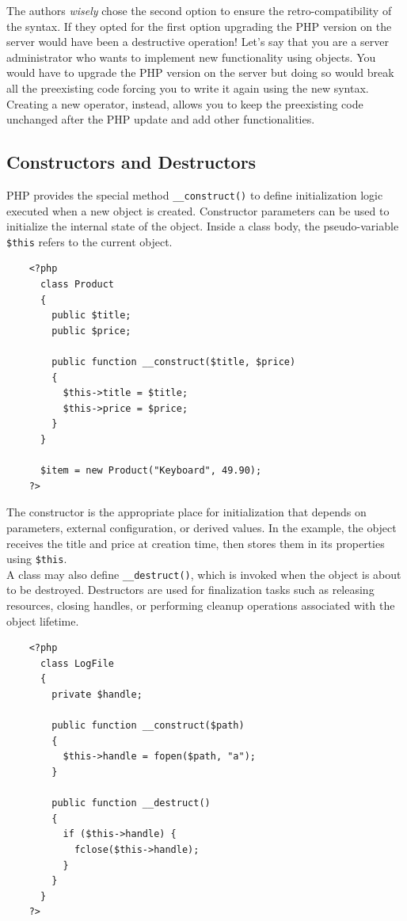 \documentclass{scrbook}
\begin{document}
	The authors \emph{wisely} chose the second option to ensure the retro-compatibility of the syntax. If they opted for the first option upgrading the PHP version on the server would have been a destructive operation! Let's say that you are a server administrator who wants to implement new functionality using objects. You would have to upgrade the PHP version on the server but doing so would break all the preexisting code forcing you to write it again using the new syntax. Creating a new operator, instead, allows you to keep the preexisting code unchanged after the PHP update and add other functionalities.
	
	\subsection{Constructors and Destructors}
	
	PHP provides the special method \texttt{\_\_construct()} to define initialization logic executed when a new object is created. Constructor parameters can be used to initialize the internal state of the object. Inside a class body, the pseudo-variable \texttt{\$this} refers to the current object.
	
	\begin{lstlisting}
	<?php
	  class Product
	  {
		public $title;
		public $price;
	
		public function __construct($title, $price)
		{
		  $this->title = $title;
		  $this->price = $price;
		}
	  }
		
	  $item = new Product("Keyboard", 49.90);
	?>
	\end{lstlisting}
	
	The constructor is the appropriate place for initialization that depends on parameters, external configuration, or derived values. In the example, the object receives the title and price at creation time, then stores them in its properties using \texttt{\$this}.\\
	
	A class may also define \texttt{\_\_destruct()}, which is invoked when the object is about to be destroyed. Destructors are used for finalization tasks such as releasing resources, closing handles, or performing cleanup operations associated with the object lifetime.
	
	\begin{lstlisting}
	<?php
	  class LogFile
	  {
		private $handle;
	
		public function __construct($path)
		{
		  $this->handle = fopen($path, "a");
		}
			
		public function __destruct()
		{
		  if ($this->handle) {
			fclose($this->handle);
		  }
		}
	  }
	?>
	\end{lstlisting}
	
\end{document}
